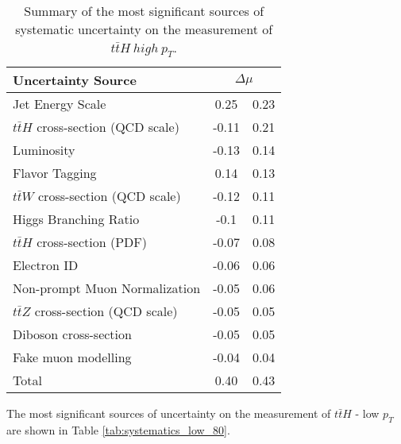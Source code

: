 \begin{table}[H]                                                                                                             
    \centering
    \begin{tabular}{l|cc}                                                                                                    
        \hline\hline                                                                                                         
        Uncertainty Source & \multicolumn{2}{c}{$\Delta \mu$ }  \\
        \hline
        Jet Energy Scale & 0.25 & 0.23 \\
        $t\bar{t}H$ cross-section (QCD scale) & -0.11 & 0.21 \\
        Luminosity & -0.13 & 0.14 \\
        Flavor Tagging & 0.14 & 0.13 \\
        $t\bar{t}W$ cross-section (QCD scale) & -0.12 & 0.11 \\
        Higgs Branching Ratio & -0.1 & 0.11 \\
        $t\bar{t}H$ cross-section (PDF) & -0.07 & 0.08 \\
        Electron ID & -0.06 & 0.06 \\
        Non-prompt Muon Normalization & -0.05 & 0.06 \\
        $t\bar{t}Z$ cross-section (QCD scale) & -0.05 & 0.05 \\
        Diboson cross-section & -0.05 & 0.05 \\
        Fake muon modelling & -0.04 & 0.04 \\
        \hline
        Total & 0.40 & 0.43 \\
        \hline\hline
    \end{tabular}
    \caption{Summary of the most significant sources of systematic uncertainty on the measurement of $t\bar{t}H\ high\ p_T$.}
    \label{tab:systematics_high_80}
\end{table}

The most significant sources of uncertainty on the measurement of $t\bar{t}H$ - low $p_T$ are shown in Table \ref{tab:systematics_low_80}.

